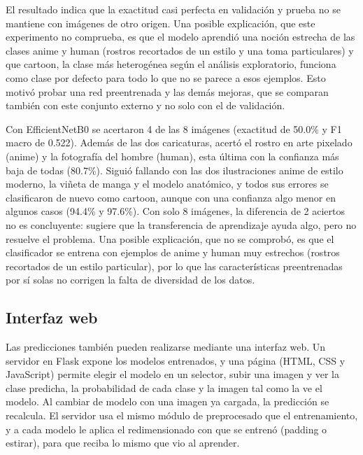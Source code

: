 \documentclass[letterpaper, 10 pt]{IEEEconf}
\begin{document}
El resultado indica que la exactitud casi perfecta en validación y prueba no se mantiene con imágenes de otro origen. Una posible explicación, que este experimento no comprueba, es que el modelo aprendió una noción estrecha de las clases anime y human (rostros recortados de un estilo y una toma particulares) y que cartoon, la clase más heterogénea según el análisis exploratorio, funciona como clase por defecto para todo lo que no se parece a esos ejemplos. Esto motivó probar una red preentrenada y las demás mejoras, que se comparan también con este conjunto externo y no solo con el de validación.

Con EfficientNetB0 se acertaron 4 de las 8 imágenes (exactitud de 50.0\% y F1 macro de 0.522). Además de las dos caricaturas, acertó el rostro en arte pixelado (anime) y la fotografía del hombre (human), esta última con la confianza más baja de todas (80.7\%). Siguió fallando con las dos ilustraciones anime de estilo moderno, la viñeta de manga y el modelo anatómico, y todos sus errores se clasificaron de nuevo como cartoon, aunque con una confianza algo menor en algunos casos (94.4\% y 97.6\%). Con solo 8 imágenes, la diferencia de 2 aciertos no es concluyente: sugiere que la transferencia de aprendizaje ayuda algo, pero no resuelve el problema. Una posible explicación, que no se comprobó, es que el clasificador se entrena con ejemplos de anime y human muy estrechos (rostros recortados de un estilo particular), por lo que las características preentrenadas por sí solas no corrigen la falta de diversidad de los datos.

\subsection{Interfaz web}

Las predicciones también pueden realizarse mediante una interfaz web. Un servidor en Flask expone los modelos entrenados, y una página (HTML, CSS y JavaScript) permite elegir el modelo en un selector, subir una imagen y ver la clase predicha, la probabilidad de cada clase y la imagen tal como la ve el modelo. Al cambiar de modelo con una imagen ya cargada, la predicción se recalcula. El servidor usa el mismo módulo de preprocesado que el entrenamiento, y a cada modelo le aplica el redimensionado con que se entrenó (padding o estirar), para que reciba lo mismo que vio al aprender.

\end{document}
